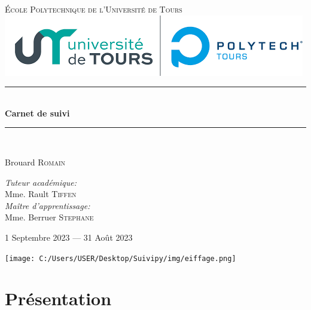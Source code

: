\documentclass[12pt, openany]{report}
\newcommand{\HRule}{\rule{\linewidth}{0.5mm}}
\begin{document}
    \begin{titlepage}
        \begin{center}
            \textsc{\LARGE École Polytechnique de l'Université de Tours}
            \\[2cm]

            \includegraphics{img/polytech}
            \\[2cm]

            \HRule \\[0.4cm]
            { \huge \bfseries Carnet de suivi\\[0.4cm] }

            \HRule \\[2cm]

            \begin{minipage}{0.4\textwidth}
                \begin{flushleft} \large
Brouard \textsc{Romain}\\\end{flushleft}
            \end{minipage}
            \begin{minipage}{0.4\textwidth}
                \begin{flushright} \large
\emph{Tuteur académique:}\\ Mme. Rault \textsc{Tiffen}\\
\emph{Maître d'apprentissage:}\\ Mme. Berruer \textsc{Stephane}\\
\end{flushright}
            \end{minipage}

            \vfill

            {\large 1\ier{} Septembre 2023 — 31 Août 2023}

\texttt{[image: C:/Users/USER/Desktop/Suivipy/img/eiffage.png]}


        \end{center}
    \end{titlepage}

    \setcounter{tocdepth}{1}
    \tableofcontents

    \chapter{Présentation}
\end{document}

